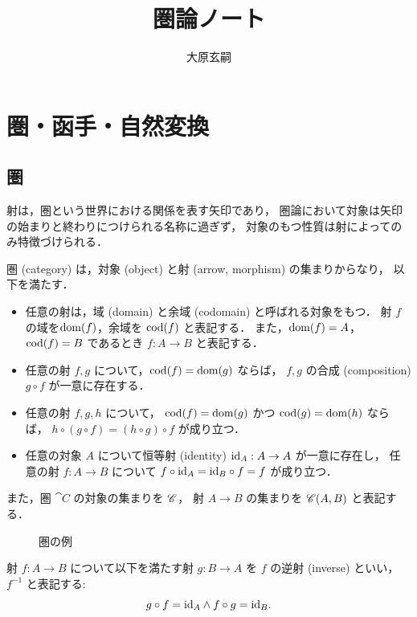 \documentclass[titlepage]{ltjsreport}
\title{圏論ノート}
\author{大原玄嗣}
\newtheorem[S]{theorem}{定理}[chapter]
\newtheorem[S]{definition}[theorem]{定義}
\newtheorem[S]{example}[theorem]{例}
\begin{document}
\maketitle

\chapter{圏・函手・自然変換}

\section{圏}

射は，圏という世界における関係を表す矢印であり，
圏論において対象は矢印の始まりと終わりにつけられる名称に過ぎず，
対象のもつ性質は射によってのみ特徴づけられる．

\begin{definition}[圏]\label{def:category}
  圏 (category) は，対象 (object) と射 (arrow, morphism) の集まりからなり，
  以下を満たす．
  \begin{itemize}
    \item 任意の射は，域 (domain) と余域 (codomain) と呼ばれる対象をもつ．
          射 $f$ の域を$\operatorname{dom}(f)$，余域を $\operatorname{cod}(f)$ と表記する．
          また，$\operatorname{dom}(f)=A$，$\operatorname{cod}(f)=B$ であるとき $f:A\to B$ と表記する．
    \item 任意の射 $f,g$ について，$\operatorname{cod}(f)=\operatorname{dom}(g)$ ならば，
          $f,g$ の合成 (composition) $g\circ f$ が一意に存在する．
    \item 任意の射 $f,g,h$ について，
          $\operatorname{cod}(f)=\operatorname{dom}(g)$ かつ $\operatorname{cod}(g)=\operatorname{dom}(h)$ ならば，
          $h\circ(g\circ f)=(h\circ g)\circ f$ が成り立つ．
    \item 任意の対象 $A$ について恒等射 (identity) $\mathrm{id}_{A}:A\to A$ が一意に存在し，
          任意の射 $f:A\to B$ について $f\circ \mathrm{id}_{A}=\mathrm{id}_{B}\circ f=f$ が成り立つ．
  \end{itemize}
  また，圏 $\cat{C}$ の対象の集まりを $\mathscr{C}$，
  射 $A\to B$ の集まりを $\mathscr{C}(A,B)$ と表記する．
\end{definition}

\begin{figure}[htbp]
  \centering
  
  \caption{圏の例}
\end{figure}

\begin{definition}[逆射]
  射 $f:A\to B$ について以下を満たす射 $g:B\to A$ を $f$ の逆射 (inverse) といい，
  $f^{-1}$ と表記する:
  \begin{equation}
    g\circ f=\mathrm{id}_{A}\wedge f\circ g=\mathrm{id}_{B}.
  \end{equation}
\end{definition}
\end{document}
